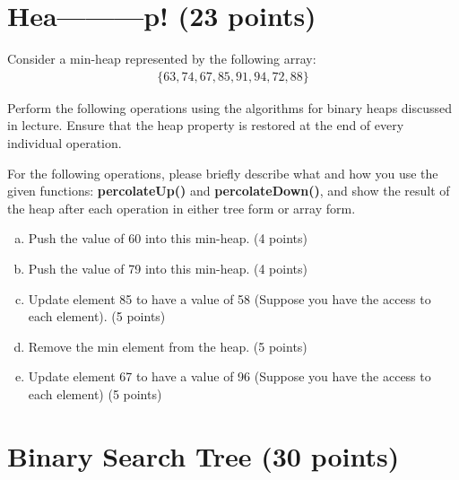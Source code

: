 \documentclass[11pt]{exam}
\begin{document}
\section{Hea---------p! (23 points)}
Consider a min-heap represented by the following array:
\begin{align*}
\{63,74,67,85,91,94,72,88\}
\end{align*}

Perform the following operations using the algorithms for binary heaps discussed in lecture. Ensure that the heap property is restored at the end of every individual operation.

For the following operations, please briefly describe what and how you use the given functions: \textbf{percolateUp()} and \textbf{percolateDown()}, and show the result of the heap after each operation in either tree form or array form.

\begin{enumerate}[a)]
\item Push the value of 60 into this min-heap. (4 points)
\begin{solution}
\end{solution}

\item Push the value of 79 into this min-heap. (4 points)
\begin{solution}
\end{solution}

\item Update element 85 to have a value of 58 (Suppose you have the access to each element). (5 points)
\begin{solution}
\end{solution}

\item Remove the min element from the heap. (5 points)
\begin{solution}
\end{solution}

\item Update element 67 to have a value of 96 (Suppose you have the access to each element) (5 points)
\begin{solution}
\end{solution}

\end{enumerate}

\section{Binary Search Tree (30 points)}
\end{document}
